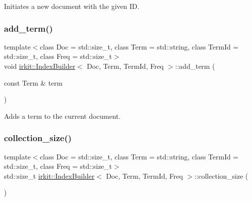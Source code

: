 Initiates a new document with the given ID. 

\mbox{\label{classirkit_1_1IndexBuilder_a6005b21c9a24cb54fe54957e21c0487a}} 
\subsubsection{\texorpdfstring{add\+\_\+term()}{add\_term()}}
{\footnotesize\ttfamily template$<$class Doc  = std\+::size\+\_\+t, class Term  = std\+::string, class Term\+Id  = std\+::size\+\_\+t, class Freq  = std\+::size\+\_\+t$>$ \\
void \hyperlink{classirkit_1_1IndexBuilder}{irkit\+::\+Index\+Builder}$<$ Doc, Term, Term\+Id, Freq $>$\+::add\+\_\+term (\begin{DoxyParamCaption}\item[{const Term \&}]{term }\end{DoxyParamCaption})\hspace{0.3cm}{\ttfamily [inline]}}



Adds a term to the current document. 

\mbox{\label{classirkit_1_1IndexBuilder_a81221fd5879c7d68d4d6bff6005b8cd7}} 
\subsubsection{\texorpdfstring{collection\+\_\+size()}{collection\_size()}}
{\footnotesize\ttfamily template$<$class Doc  = std\+::size\+\_\+t, class Term  = std\+::string, class Term\+Id  = std\+::size\+\_\+t, class Freq  = std\+::size\+\_\+t$>$ \\
std\+::size\+\_\+t \hyperlink{classirkit_1_1IndexBuilder}{irkit\+::\+Index\+Builder}$<$ Doc, Term, Term\+Id, Freq $>$\+::collection\+\_\+size (\begin{DoxyParamCaption}{ }\end{DoxyParamCaption})\hspace{0.3cm}{\ttfamily [inline]}}



